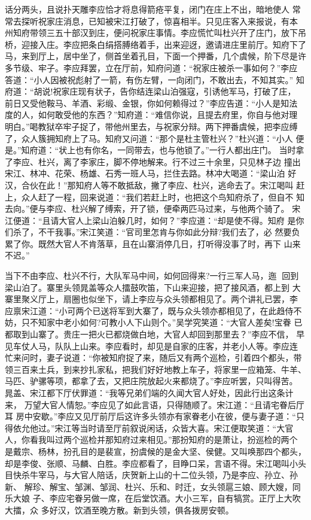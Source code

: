 话分两头，且说扑天雕李应恰才将息得箭疮平复，闭门在庄上不出，暗地使人
常常去探听祝家庄消息，已知被宋江打破了，惊喜相半。只见庄客入来报说，有本
州知府带领三五十部汉到庄，便问祝家庄事情。李应慌忙叫杜兴开了庄门，放下吊
桥，迎接入庄。李应把条白绢搭膊络着手，出来迎迓，邀请进庄里前厅。知府下了
马，来到厅上，居中坐了，侧首坐着孔目，下面一个押番，几个虞候，阶下尽是许
多节级、牢子。李应拜罢，立在厅前，知府问道：“祝家庄被杀一事如何？”李应
答道：“小人因被祝彪射了一箭，有伤左臂，一向闭门，不敢出去，不知其实。”
知府道：“胡说!祝家庄现有状子，告你结连梁山泊强寇，引诱他军马，打破了庄，
前日又受他鞍马、羊酒、彩缎、金银，你如何赖得过？”李应告道：“小人是知法
度的人，如何敢受他的东西？”知府道：“难信你说，且提去府里，你自与他对理
明白。”喝教狱卒牢子捉了，带他州里去，与祝家分辩。两下押番虞候，把李应缚
了，众人簇拥知府上了马。知府又问道：“那个是杜主管杜兴？”杜兴道：“小人
便是。”知府道：“状上也有你名，一同带去，也与他锁了。”一行人都出庄门。
当时拿了李应、杜兴，离了李家庄，脚不停地解来。行不过三十余里，只见林子边
撞出宋江、林冲、花荣、杨雄、石秀一班人马，拦住去路。林冲大喝道：“梁山泊
好汉，合伙在此！”那知府人等不敢抵敌，撇了李应、杜兴，逃命去了。宋江喝叫
赶上，众人赶了一程，回来说道：“我们若赶上时，也把这个鸟知府杀了，但自不
知去向。”便与李应、杜兴解了缚索，开了锁，便牵两匹马过来，与他两个骑了。
宋江便道：“且请大官人上梁山泊躲几时，如何？”李应道：“却是使不得。知府
是你们杀了，不干我事。”宋江笑道：“官司里怎肯与你如此分辩?我们去了，必
然要负累了你。既然大官人不肯落草，且在山寨消停几日，打听得没事了时，再下
山来不迟。”

当下不由李应、杜兴不行，大队军马中间，如何回得来?一行三军人马，迤
回到梁山泊了。寨里头领晁盖等众人擂鼓吹笛，下山来迎接，把了接风酒，都上到
大寨里聚义厅上，扇圈也似坐下，请上李应与众头领都相见了。两个讲礼已罢，李
应禀宋江道：“小可两个已送将军到大寨了，既与众头领亦都相见了，在此趋侍不
妨，只不知家中老小如何?可教小人下山则个。”吴学究笑道：“大官人差矣!宝眷
已都取到山寨了。贵庄一把火已都烧做白地，大官人却回到那里去？”李应不信，
早见车仗人马，队队上山来。李应看时，却见是自家的庄客，并老小人等。李应连
忙来问时，妻子说道：“你被知府捉了来，随后又有两个巡检，引着四个都头，带
领三百来土兵，到来抄扎家私，把我们好好地教上车子，将家里一应箱笼、牛羊、
马匹、驴骡等项，都拿了去，又把庄院放起火来都烧了。”李应听罢，只叫得苦。
晁盖、宋江都下厅伏罪道：“我等兄弟们端的久闻大官人好处，因此行出这条计来，
万望大官人情恕。”李应见了如此言语，只得随顺了。宋江道：“且请宅眷后厅耳
房中安歇。”李应又见厅前厅后这许多头领亦有家眷老小在彼，便与妻子道：“只
得依允他过。”宋江等当时请至厅前叙说闲话，众皆大喜。宋江便取笑道：“大官
人，你看我叫过两个巡检并那知府过来相见。”那扮知府的是萧让，扮巡检的两个
是戴宗、杨林，扮孔目的是裴宣，扮虞候的是金大坚、侯健。又叫唤那四个都头，
却是李俊、张顺、马麟、白胜。李应都看了，目睁口呆，言语不得。宋江喝叫小头
目快杀牛宰马，与大官人陪话，庆贺新上山的十二位头领，乃是李应、孙立、孙新、
解珍、解宝、邹渊、邹润、杜兴、乐和、时迁，女头领扈三娘、顾大嫂，同乐大娘
子、李应宅眷另做一席，在后堂饮酒。大小三军，自有犒赏。正厅上大吹大擂，众
多好汉，饮酒至晚方散。新到头领，俱各拨房安顿。

